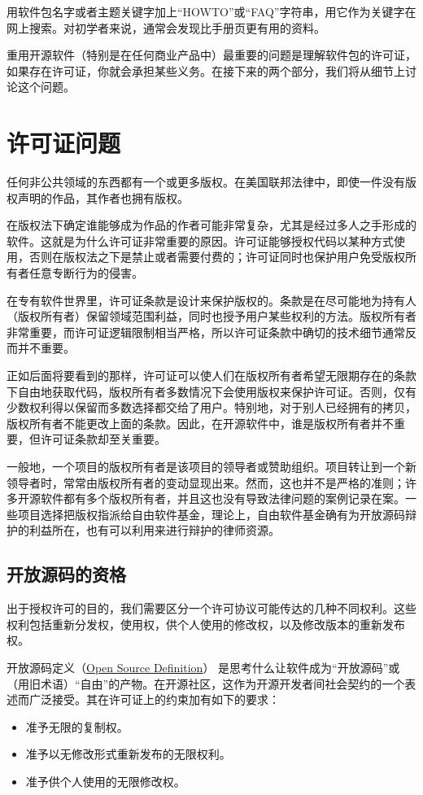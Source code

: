 \documentclass[12pt,oneside]{ctexbook}
\begin{document}
\begin{common-format}
用软件包名字或者主题关键字加上“HOWTO”或“FAQ”字符串，用它作为关键字在网上搜索。对初学者来说，通常会发现比手册页更有用的资料。

重用开源软件（特别是在任何商业产品中）最重要的问题是理解软件包的许可证，如果存在许可证，你就会承担某些义务。在接下来的两个部分，我们将从细节上讨论这个问题。


\section{许可证问题}
任何非公共领域的东西都有一个或更多版权。在美国联邦法律中，即使一件没有版权声明的作品，其作者也拥有版权。

在版权法下确定谁能够成为作品的作者可能非常复杂，尤其是经过多人之手形成的软件。这就是为什么许可证非常重要的原因。许可证能够授权代码以某种方式使用，否则在版权法之下是禁止或者需要付费的；许可证同时也保护用户免受版权所有者任意专断行为的侵害。

在专有软件世界里，许可证条款是设计来保护版权的。条款是在尽可能地为持有人（版权所有者）保留领域范围利益，同时也授予用户某些权利的方法。版权所有者非常重要，而许可证逻辑限制相当严格，所以许可证条款中确切的技术细节通常反而并不重要。

正如后面将要看到的那样，许可证可以使人们在版权所有者希望无限期存在的条款下自由地获取代码，版权所有者多数情况下会使用版权来保护许可证。否则，仅有少数权利得以保留而多数选择都交给了用户。特别地，对于别人已经拥有的拷贝，版权所有者不能更改上面的条款。因此，在开源软件中，谁是版权所有者并不重要，但许可证条款却至关重要。

一般地，一个项目的版权所有者是该项目的领导者或赞助组织。项目转让到一个新领导者时，常常由版权所有者的变动显现出来。然而，这也并不是严格的准则；许多开源软件都有多个版权所有者，并且这也没有导致法律问题的案例记录在案。一些项目选择把版权指派给自由软件基金，理论上，自由软件基金确有为开放源码辩护的利益所在，也有可以利用来进行辩护的律师资源。

\subsection{开放源码的资格}
出于授权许可的目的，我们需要区分一个许可协议可能传达的几种不同权利。这些权利包括重新分发权，使用权，供个人使用的修改权，以及修改版本的重新发布权。

开放源码定义（\href{http://www.opensource.org/osd.html}{Open Source Definition}） 是思考什么让软件成为“开放源码”或（用旧术语）“自由”的产物。在开源社区，这作为开源开发者间社会契约的一个表述而广泛接受。其在许可证上的约束加有如下的要求：
\begin{itemize}
\item 准予无限的复制权。
\item 准予以无修改形式重新发布的无限权利。
\item 准予供个人使用的无限修改权。
\end{itemize}


\end{common-format}
\end{document}
